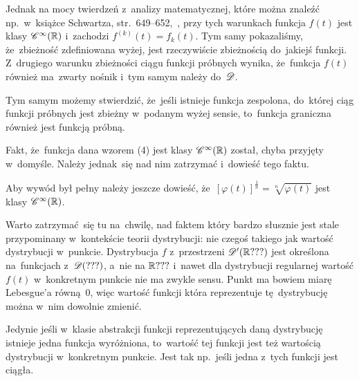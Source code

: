 \documentclass[a4paper,11pt]{article}
\begin{document}
Jednak na mocy twierdzeń z~analizy matematycznej, które można znaleźć
np.~w~książce Schwartza, str.~649--652,~\cite{SchwartzKursAnalizyMatematycznejVolI1979}, przy tych
warunkach funkcja $f( t )$ jest klasy $\mathcal{C}^{ \infty }( \mathbb{R} )$ i~zachodzi
$f^{ ( k ) }( t ) = f_{ k }( t )$. Tym samy pokazaliśmy, że~zbieżność
zdefiniowana wyżej, jest rzeczywiście zbieżnością do~jakiejś funkcji.
Z~drugiego warunku zbieżności ciągu funkcji próbnych wynika,
że~funkcja $f( t )$ również ma~zwarty nośnik i~tym samym należy
do~$\mathcal{D}$.

Tym samym możemy stwierdzić, że~jeśli istnieje funkcja zespolona,
do~której ciąg funkcji próbnych jest zbieżny w~podanym wyżej sensie,
to~funkcja graniczna również jest funkcją próbną.

\vspace{\spaceFour}



\start {} Fakt, że~funkcja dana wzorem (4) jest klasy
$\mathcal{C}^{ \infty }( \mathbb{R} )$ został, chyba przyjęty w~domyśle. Należy jednak~się
nad nim zatrzymać i~dowieść tego faktu. \Dok

\vspace{\spaceFour}



\start {} Aby wywód był pełny należy jeszcze dowieść,
że~$[ \varphi( t ) ]^{ \frac{ 1 }{ n } } = \sqrt[ n ]{ \varphi( t ) }$ jest
klasy $\mathcal{C}^{ \infty }( \mathbb{R} )$.

\vspace{\spaceFour}



\start {} Warto zatrzymać~się tu na~chwilę, nad faktem który
bardzo słusznie jest stale przypominany w~kontekście teorii
dystrybucji: nie czegoś takiego jak wartość dystrybucji w~punkcie.
Dystrybucja $f$ z~przestrzeni $\mathcal{D}'( \mathbb{R} ??? )$ jest określona
na~funkcjach z~$\mathcal{D}( ??? )$, a~nie na $\mathbb{R} ???$ i~nawet dla dystrybucji
regularnej wartość $f( t )$ w~konkretnym punkcie nie ma zwykle sensu.
Punkt ma bowiem miarę Lebesgue'a równą~0, więc wartość funkcji która
reprezentuje tę~dystrybucję można w~nim dowolnie zmienić.

Jedynie jeśli w~klasie abstrakcji funkcji reprezentujących daną
dystrybucję istnieje jedna funkcja wyróżniona, to~wartość tej funkcji
jest też wartością dystrybucji w~konkretnym punkcie. Jest tak
np.~jeśli jedna z~tych funkcji jest ciągła.

\vspace{\spaceFour}
\end{document}
